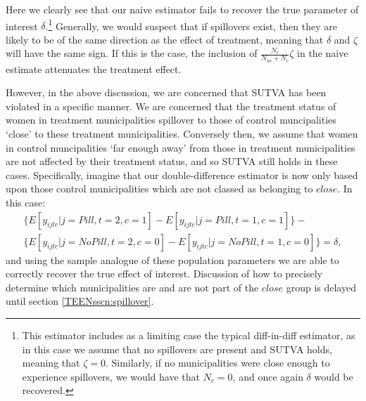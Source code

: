Here we clearly see that our naive estimator fails to recover the true parameter
of interest $\delta$.\footnote{This estimator includes as a limiting case the
typical diff-in-diff estimator, as in this case we assume that no spillovers are 
present and SUTVA holds, meaning that $\zeta=0$.  Similarly, if no municipalities 
were close enough to experience spillovers, we would have that $N_c=0$, and once 
again $\delta$ would be recovered.}  Generally, we would suspect that if 
spillovers exist, then they are likely to be of the same direction as the effect 
of treatment, meaning that $\delta$ and $\zeta$ will have the same sign.  If this 
is the case, the inclusion of $\frac{N_c}{N_{nc}+N_c}\zeta$ in the naive estimate 
attenuates the treatment effect.

However, in the above discussion, we are concerned that SUTVA has been violated 
in a specific manner.  We are concerned that the treatment status of women in 
treatment municipalities spillover to those of control muncipalities `close' to 
these treatment municipalities.  Conversely then, we assume that women in 
control muncipalities `far enough away' from those in treatment municipalities 
are not affected by their treatment status, and so SUTVA still holds in these 
cases.  Specifically, imagine that our double-difference estimator is now only 
based upon those control municipalities which are not classed as belonging to 
$close$.  In this case:
\begin{equation}
 \label{TEENeqn:DDaextend}
\begin{split}
 \{E[y_{ijtc}|j=Pill,t=2,c=1]- E[y_{ijtc}|j=Pill,t=1,c=1]\}-\\
 \{E[y_{ijtc}|j=No Pill,t=2,c=0]- E[y_{ijtc}|j=No Pill,t=1,c=0]\} = \delta,
 \end{split}
\end{equation}
and using the sample analogue of these population parameters we are able to
correctly recover the true effect of interest.  Discussion of how to precisely
determine which municipalities are and are not part of the $close$ group is 
delayed until section \ref{TEENsscn:spillover}.

